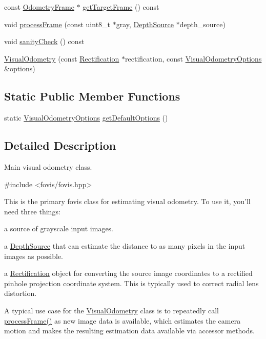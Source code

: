 \begin{DoxyCompactItemize}
const \hyperlink{classfovis_1_1OdometryFrame}{OdometryFrame} $\ast$ \hyperlink{classfovis_1_1VisualOdometry_a69e5a07d97c47fc049a42f2ba2939cab}{getTargetFrame} () const 
\item 
void \hyperlink{classfovis_1_1VisualOdometry_a58914d47aef477789e434ef7f484d4bb}{processFrame} (const uint8\_\-t $\ast$gray, \hyperlink{classfovis_1_1DepthSource}{DepthSource} $\ast$depth\_\-source)
\item 
void \hyperlink{classfovis_1_1VisualOdometry_a892c8032392efdef960a30a2e8cd817c}{sanityCheck} () const 
\item 
\hyperlink{classfovis_1_1VisualOdometry_a0800e59ff148f215673b02b60a9f1d2c}{VisualOdometry} (const \hyperlink{classfovis_1_1Rectification}{Rectification} $\ast$rectification, const \hyperlink{group__FovisCore_ga113578b67d3e37bc78f1fffd8440e1ff}{VisualOdometryOptions} \&options)
\end{DoxyCompactItemize}
\subsection*{Static Public Member Functions}
\begin{DoxyCompactItemize}
\item 
static \hyperlink{group__FovisCore_ga113578b67d3e37bc78f1fffd8440e1ff}{VisualOdometryOptions} \hyperlink{classfovis_1_1VisualOdometry_a00ae0b1c3d48cf00aebf4b0c820980a9}{getDefaultOptions} ()
\end{DoxyCompactItemize}


\subsection{Detailed Description}
Main visual odometry class. 


\begin{DoxyCode}
 #include <fovis/fovis.hpp>
\end{DoxyCode}


This is the primary fovis class for estimating visual odometry. To use it, you'll need three things: \begin{DoxyItemize}
\item a source of grayscale input images. \item a \hyperlink{classfovis_1_1DepthSource}{DepthSource} that can estimate the distance to as many pixels in the input images as possible. \item a \hyperlink{classfovis_1_1Rectification}{Rectification} object for converting the source image coordinates to a rectified pinhole projection coordinate system. This is typically used to correct radial lens distortion.\end{DoxyItemize}
A typical use case for the \hyperlink{classfovis_1_1VisualOdometry}{VisualOdometry} class is to repeatedly call \hyperlink{classfovis_1_1VisualOdometry_a58914d47aef477789e434ef7f484d4bb}{processFrame()} as new image data is available, which estimates the camera motion and makes the resulting estimation data available via accessor methods.

